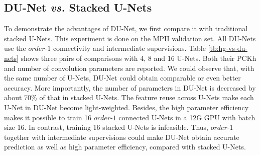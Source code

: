 
\subsection{DU-Net {\it vs.} Stacked U-Nets}
To demonstrate the advantages of DU-Net, we first compare it with traditional stacked U-Nets. This experiment is done on the MPII validation set. All DU-Nets use the $order$-$1$ connectivity and intermediate supervisions. Table \ref{tb:hg-vs-du-nets} shows three pairs of comparisons with 4, 8 and 16 U-Nets. Both their PCKh and number of convolution parameters are reported. We could observe that, with the same number of U-Nets, DU-Net could obtain comparable or even better accuracy. More importantly, the number of parameters in DU-Net is decreased by about 70\% of that in stacked U-Nets. The feature reuse across U-Nets make each U-Net in DU-Net become light-weighted. Besides, the high parameter efficiency makes it possible to train 16 $order$-$1$ connected U-Nets in a 12G GPU with batch size 16. In contrast, training 16 stacked U-Nets is infeasible. Thus, $order$-$1$ together with intermediate supervisions could make DU-Net obtain accurate prediction as well as high parameter efficiency, compared with stacked U-Nets.

